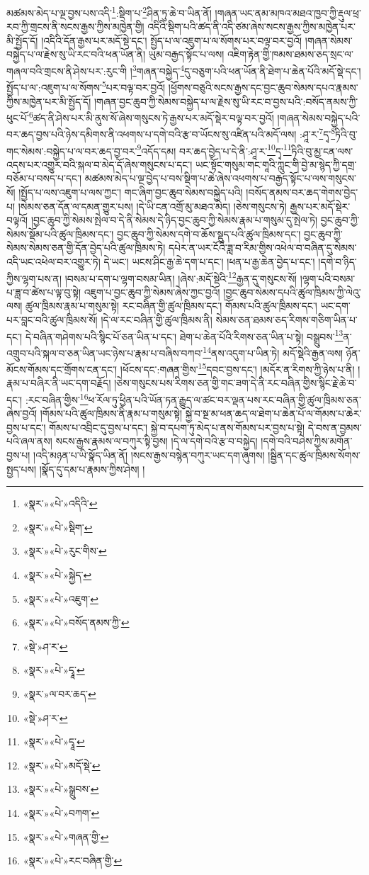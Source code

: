 མཚམས་མེད་པ་ལྔ་བྱས་པས་འདི་\footnote{«སྣར་»«པེ་»འདིའི་}:སྡིག་པ་\footnote{«སྣར་»«པེ་»སྡིག་}ཤིན་ཏུ་ཆེ་བ་ཡིན་ནོ། །གཞན་ཡང་ནམ་མཁའ་མཐའ་ཁྱབ་ཀྱི་རྡུལ་ཕྲ་རབ་ཀྱི་གྲངས་ནི་སངས་རྒྱས་ཀྱིས་མཁྱེན་གྱི། འདིའི་སྡིག་པའི་ཚད་ནི་འདི་ཙམ་ཞེས་སངས་རྒྱས་ཀྱིས་མཁྱེན་པར་མི་སྤྱོད་དོ། །འདིའི་དོན་རྒྱས་པར་མདོ་སྡེ་དང་། སྤྱོད་པ་ལ་འཇུག་པ་ལ་སོགས་པར་བལྟ་བར་བྱའོ། །གཞན་སེམས་བསྐྱེད་པ་ལ་རྗེས་སུ་ཡི་རང་བའི་ཕན་ཡོན་ནི། ཡུམ་བརྒྱད་སྟོང་པ་ལས། འཇིག་རྟེན་གྱི་ཁམས་ཐམས་ཅད་སྲང་ལ་གཞལ་བའི་གྲངས་ནི་ཤེས་པར་:རུང་གི །\footnote{«སྣར་»«པེ་»རུང་གིས་}གཞན་བསྐྱེད་\footnote{«སྣར་»«པེ་»སྐྱེད་}དུ་བཅུག་པའི་ཕན་ཡོན་ནི་ཐེག་པ་ཆེན་པོའི་མདོ་སྡེ་དང་། སྤྱོད་པ་ལ་:འཇུག་པ་ལ་སོགས་\footnote{«སྣར་»«པེ་»འཇུག་}པར་བལྟ་བར་བྱའོ། །ཕྱོགས་བཅུའི་སངས་རྒྱས་དང་བྱང་ཆུབ་སེམས་དཔའ་རྣམས་ཀྱིས་མཁྱེན་པར་མི་སྤྱོད་དོ། །གཞན་བྱང་ཆུབ་ཀྱི་སེམས་བསྐྱེད་པ་ལ་རྗེས་སུ་ཡི་རང་བ་བྱས་པའི་:བསོད་ནམས་ཀྱི་ཕུང་པོ་\footnote{«སྣར་»«པེ་»བསོད་ནམས་ཀྱི་}ཚད་ནི་ཤེས་པར་མི་ནུས་སོ་ཞེས་གསུངས་ཏེ་རྒྱས་པར་མདོ་སྡེར་བལྟ་བར་བྱའོ། །གཞན་སེམས་བསྐྱེད་པའི་བར་ཆད་བྱས་པའི་ཉེས་དམིགས་ནི་འཕགས་པ་དགེ་བའི་རྩ་བ་ཡོངས་སུ་འཛིན་པའི་མདོ་ལས། :ཤཱ་ར་\footnote{«སྡེ་»ཤ་ར་}དྭ་\footnote{«སྣར་»«པེ་»དྭཱ་}ཏིའི་བུ་གང་སེམས་:བསྐྱེད་པ་ལ་བར་ཆད་བྱ་བར་\footnote{«སྣར་»ལ་བར་ཆད་}འདོད་དམ། བར་ཆད་བྱེད་པ་དེ་ནི་:ཤཱ་ར་\footnote{«སྡེ་»ཤ་ར་}དྭ་\footnote{«སྣར་»«པེ་»དྭཱ་}ཏིའི་བུ་མྱ་ངན་ལས་འདས་པར་འགྱུར་བའི་སྐལ་བ་མེད་དོ་ཞེས་གསུངས་པ་དང་། ཡང་སྟོང་གསུམ་གང་གཱའི་ཀླུང་གི་བྱེ་མ་སྙེད་ཀྱི་དགྲ་བཅོམ་པ་བསད་པ་དང་། མཚམས་མེད་པ་ལྔ་བྱེད་པ་བས་སྡིག་པ་ཆེ་ཞེས་འཕགས་པ་བརྒྱད་སྟོང་པ་ལས་གསུངས་སོ། །སྤྱོད་པ་ལས་འཇུག་པ་ལས་ཀྱང་། གང་ཞིག་བྱང་ཆུབ་སེམས་བསྐྱེད་པའི། །བསོད་ནམས་བར་ཆད་གེགས་བྱེད་པ། །སེམས་ཅན་དོན་ལ་དམན་གྱུར་པས། །དེ་ཡི་ངན་འགྲོ་མུ་མཐའ་མེད། །ཅེས་གསུངས་ཏེ། རྒྱས་པར་མདོ་སྡེར་བལྟའོ། །བྱང་ཆུབ་ཀྱི་སེམས་སྤེལ་བ་དེ་ནི་སེམས་དེ་ཉིད་བྱང་ཆུབ་ཀྱི་སེམས་རྣམ་པ་གསུམ་དུ་སྤེལ་ཏེ། བྱང་ཆུབ་ཀྱི་སེམས་སྡོམ་པའི་ཚུལ་ཁྲིམས་དང་། བྱང་ཆུབ་ཀྱི་སེམས་དགེ་བ་ཆོས་སྡུད་པའི་ཚུལ་ཁྲིམས་དང་། བྱང་ཆུབ་ཀྱི་སེམས་སེམས་ཅན་གྱི་དོན་བྱེད་པའི་ཚུལ་ཁྲིམས་ཏེ། དཔེར་ན་ཡར་ངོའི་ཟླ་བ་རིམ་གྱིས་འཕེལ་བ་བཞིན་དུ་སེམས་འདི་ཡང་འཕེལ་བར་འགྱུར་ཏེ། དེ་ཡང་། ཡངས་ཤིང་རྒྱ་ཆེ་དག་པ་དང་། །ཕན་པ་རྒྱ་ཆེན་བྱེད་པ་དང་། །དགེ་བ་ཉིད་ཀྱིས་ལྷག་པས་ན། །བསམ་པ་དག་པ་ལྷག་བསམ་ཡིན། །ཞེས་:མདོ་སྡེའི་\footnote{«སྣར་»«པེ་»མདོ་སྡེ་}རྒྱན་དུ་གསུངས་སོ། །ལྷག་པའི་བསམ་པ་ཟླ་བ་ཚེས་པ་ལྟ་བུ་སྟེ། འཇུག་པ་བྱང་ཆུབ་ཀྱི་སེམས་ཞེས་ཀྱང་བྱའོ། །བྱང་ཆུབ་སེམས་དཔའི་ཚུལ་ཁྲིམས་ཀྱི་ལེའུ་ལས། ཚུལ་ཁྲིམས་རྣམ་པ་གསུམ་སྟེ། རང་བཞིན་གྱི་ཚུལ་ཁྲིམས་དང་། གོམས་པའི་ཚུལ་ཁྲིམས་དང་། ཡང་དག་པར་བླང་བའི་ཚུལ་ཁྲིམས་སོ། །དེ་ལ་རང་བཞིན་གྱི་ཚུལ་ཁྲིམས་ནི། སེམས་ཅན་ཐམས་ཅད་རིགས་གཅིག་ཡིན་པ་དང་། དེ་བཞིན་གཤེགས་པའི་སྙིང་པོ་ཅན་ཡིན་པ་དང་། ཐེག་པ་ཆེན་པོའི་རིགས་ཅན་ཡིན་པ་སྟེ། བསྒྲུབས་\footnote{«སྣར་»«པེ་»སྒྲུབས་}ན་འགྲུབ་པའི་སྐལ་བ་ཅན་ཡིན་ཡང་ཉེས་པ་རྣམ་པ་བཞིས་བཀབ་\footnote{«སྣར་»«པེ་»བཀག་}ནས་འདུག་པ་ཡིན་ཏེ། མདོ་སྡེའི་རྒྱན་ལས། ཉོན་མོངས་གོམས་དང་གྲོགས་ངན་དང་། །ཕོངས་དང་:གཞན་གྱིས་\footnote{«སྣར་»«པེ་»གཞན་གྱི་}དབང་བྱས་དང་། །མདོར་ན་རིགས་ཀྱི་ཉེས་པ་ནི། །རྣམ་པ་བཞིར་ནི་ཡང་དག་བརྗོད། །ཅེས་གསུངས་པས་རིགས་ཅན་གྱི་གང་ཟག་དེ་ནི་རང་བཞིན་གྱིས་སྙིང་རྗེ་ཆེ་བ་དང་། :རང་བཞིན་གྱིས་\footnote{«སྣར་»«པེ་»རང་བཞིན་གྱི་}ཕ་རོལ་ཏུ་ཕྱིན་པའི་ཡོན་ཏན་རྒྱུད་ལ་ཚང་བར་ལྡན་པས་རང་བཞིན་གྱི་ཚུལ་ཁྲིམས་ཅན་ཞེས་བྱའོ། །གོམས་པའི་ཚུལ་ཁྲིམས་ནི་རྣམ་པ་གསུམ་སྟེ། སྐྱེ་བ་སྔ་མ་ཕན་ཆད་ལ་ཐེག་པ་ཆེན་པོ་ལ་གོམས་པ་ཆེར་བྱས་པ་དང་། གོམས་པ་འབྲིང་དུ་བྱས་པ་དང་། སྐྱེ་བ་དཔག་ཏུ་མེད་པ་ནས་གོམས་པར་བྱས་པ་སྟེ། དེ་བས་ན་བྱམས་པའི་ཞལ་ནས། སངས་རྒྱས་རྣམས་ལ་བཀུར་སྟི་བྱས། །དེ་ལ་དགེ་བའི་རྩ་བ་བསྐྱེད། །དགེ་བའི་བཤེས་ཀྱིས་མགོན་བྱས་པ། །འདི་མཉན་པ་ཡི་སྣོད་ཡིན་ནོ། །སངས་རྒྱས་བསྙེན་བཀུར་ཡང་དག་ཞུགས། །སྦྱིན་དང་ཚུལ་ཁྲིམས་སོགས་སྤྱད་པས། །སྣོད་དུ་དམ་པ་རྣམས་ཀྱིས་ཤེས། །
